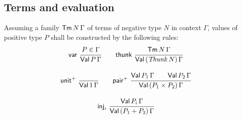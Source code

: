 \documentclass[sigplan,screen,fleqn]{acmart}
\begin{document}
\subsection{Terms and evaluation}

Assuming a family $\mathsf{Tm}^{\,}N\,\Gamma$ of terms of negative type $N$ in
context $\Gamma$, values 
of positive type $P$ shall be constructed by the
following rules:
\begin{gather*}
  \nru{\tvar}{P \in \Gamma}{\PValT P \Gamma}
\qquad
  \nru{\tthunk}{\Tm N \Gamma}{\PValTP{\Thunk N}\Gamma}
\\[2ex]
  \nru{\punit}{}{\PValT{\tyone}\Gamma}
\qquad
  \nru{\ppair}
      {\PValT{P_1}\Gamma \qquad \PValT{P_2}\Gamma}
      {\PValTP{P_1 \times P_2}\Gamma}
\\[2ex]
  \nru{\tinj_i}{\PValT{P_i}\Gamma}{\PValTP{P_1 + P_2}\Gamma}
\end{gather*}
\end{document}
